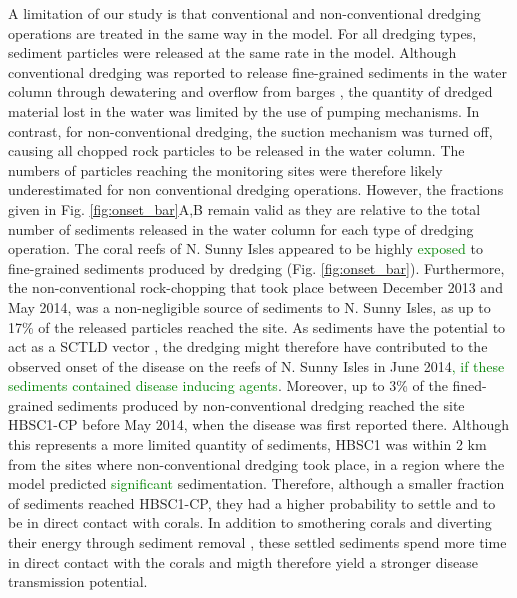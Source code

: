 \documentclass[preprint,12pt,authoryear]{elsarticle}
\newcommand{\modif}[1]{\textcolor{green}{#1}}
\begin{document}
A limitation of our study is that conventional and non-conventional dredging operations are treated in the same way in the model. For all dredging types, sediment particles were released at the same rate in the model. Although conventional dredging was reported to release fine-grained sediments in the water column through dewatering and overflow from barges \citep{jones2016assessing}, the quantity of dredged material lost in the water was limited by the use of pumping mechanisms. In contrast, for non-conventional dredging, the suction mechanism was turned off, causing all chopped rock particles to be released in the water column. The numbers of particles reaching the monitoring sites were therefore likely underestimated for non conventional dredging operations. However, the fractions given in Fig. \ref{fig:onset_bar}A,B remain valid as they are relative to the total number of sediments released in the water column for each type of dredging operation. The coral reefs of N. Sunny Isles appeared to be highly \modif{exposed} to fine-grained sediments produced by dredging (Fig. \ref{fig:onset_bar}). Furthermore, the non-conventional rock-chopping that took place between December 2013 and May 2014, was a non-negligible source of sediments to N. Sunny Isles, as up to 17\% of the released particles reached the site. As sediments have the potential to act as a SCTLD vector \citep{rosales2020rhodobacterales, studivan2022reef}, the dredging might therefore have contributed to the observed onset of the disease on the reefs of N. Sunny Isles in June 2014\modif{, if these sediments contained disease inducing agents}. Moreover, up to 3\% of the fined-grained sediments produced by non-conventional dredging reached the site HBSC1-CP before May 2014, when the disease was first reported there. Although this represents a more limited quantity of sediments, HBSC1 was within 2 km from the sites where non-conventional dredging took place, in a region where the model predicted \modif{significant} sedimentation. Therefore, although a smaller fraction of sediments reached HBSC1-CP, they had a higher probability to settle and to be in direct contact with corals. In addition to smothering corals and diverting their energy through sediment removal \citep{erftemeijer2012environmental}, these settled sediments spend more time in direct contact with the corals and migth therefore yield a stronger disease transmission potential.
\end{document}
